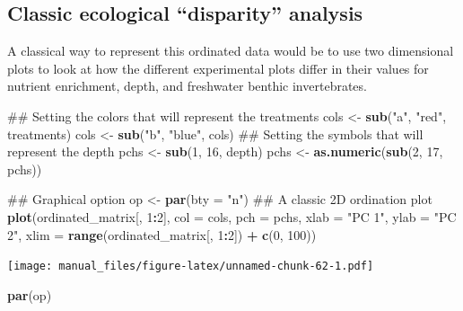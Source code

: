 \documentclass[]{book}
\newenvironment{Shaded}{\begin{snugshade}}{\end{snugshade}}
\newcommand{\KeywordTok}[1]{\textcolor[rgb]{0.13,0.29,0.53}{\textbf{#1}}}
\newcommand{\DataTypeTok}[1]{\textcolor[rgb]{0.13,0.29,0.53}{#1}}
\newcommand{\DecValTok}[1]{\textcolor[rgb]{0.00,0.00,0.81}{#1}}
\newcommand{\StringTok}[1]{\textcolor[rgb]{0.31,0.60,0.02}{#1}}
\newcommand{\OperatorTok}[1]{\textcolor[rgb]{0.81,0.36,0.00}{\textbf{#1}}}
\newcommand{\NormalTok}[1]{#1}
\theoremstyle{definition}
\theoremstyle{definition}
\theoremstyle{remark}
\begin{document}
\subsection{\texorpdfstring{Classic ecological ``disparity''
analysis}{Classic ecological disparity analysis}}\label{classic-ecological-disparity-analysis}

A classical way to represent this ordinated data would be to use two
dimensional plots to look at how the different experimental plots differ
in their values for nutrient enrichment, depth, and freshwater benthic
invertebrates.

\begin{Shaded}
\begin{Highlighting}[]
\NormalTok{## Setting the colors that will represent the treatments}
\NormalTok{cols <-}\StringTok{ }\KeywordTok{sub}\NormalTok{(}\StringTok{"a"}\NormalTok{, }\StringTok{"red"}\NormalTok{, treatments)}
\NormalTok{cols <-}\StringTok{ }\KeywordTok{sub}\NormalTok{(}\StringTok{"b"}\NormalTok{, }\StringTok{"blue"}\NormalTok{, cols)}
\NormalTok{## Setting the symbols that will represent the depth}
\NormalTok{pchs <-}\StringTok{ }\KeywordTok{sub}\NormalTok{(}\DecValTok{1}\NormalTok{, }\DecValTok{16}\NormalTok{, depth)}
\NormalTok{pchs <-}\StringTok{ }\KeywordTok{as.numeric}\NormalTok{(}\KeywordTok{sub}\NormalTok{(}\DecValTok{2}\NormalTok{, }\DecValTok{17}\NormalTok{, pchs))}

\NormalTok{## Graphical option}
\NormalTok{op <-}\StringTok{ }\KeywordTok{par}\NormalTok{(}\DataTypeTok{bty =} \StringTok{"n"}\NormalTok{)}
\NormalTok{## A classic 2D ordination plot}
\KeywordTok{plot}\NormalTok{(ordinated_matrix[, }\DecValTok{1}\OperatorTok{:}\DecValTok{2}\NormalTok{], }\DataTypeTok{col =}\NormalTok{ cols, }\DataTypeTok{pch =}\NormalTok{ pchs,}
     \DataTypeTok{xlab =} \StringTok{"PC 1"}\NormalTok{, }\DataTypeTok{ylab =} \StringTok{"PC 2"}\NormalTok{,}
     \DataTypeTok{xlim =} \KeywordTok{range}\NormalTok{(ordinated_matrix[, }\DecValTok{1}\OperatorTok{:}\DecValTok{2}\NormalTok{]) }\OperatorTok{+}\StringTok{ }\KeywordTok{c}\NormalTok{(}\DecValTok{0}\NormalTok{, }\DecValTok{100}\NormalTok{))}
\end{Highlighting}
\end{Shaded}

\texttt{[image: manual\_files/figure-latex/unnamed-chunk-62-1.pdf]}

\begin{Shaded}
\begin{Highlighting}[]
\KeywordTok{par}\NormalTok{(op)}
\end{Highlighting}
\end{Shaded}
\end{document}
